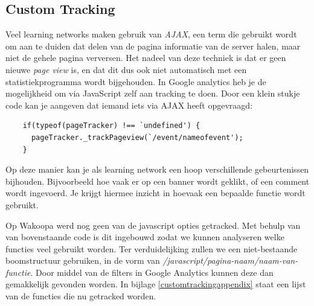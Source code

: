 \documentclass[a4paper, 10pt, pdftex]{report}
\begin{document}
    \subsection{Custom Tracking}
    Veel learning networks maken gebruik van \emph{AJAX}, een term die gebruikt wordt om aan te duiden dat delen van de pagina informatie van de server halen, maar niet de gehele pagina verversen. Het nadeel van deze techniek is dat er geen nieuwe \emph{page view} is, en dat dit dus ook niet automatisch met een statistiekprogramma wordt bijgehouden. In Google analytics heb je de mogelijkheid om via JavaScript zelf aan tracking te doen. Door een klein stukje code kan je aangeven dat iemand iets via AJAX heeft opgevraagd:
    \begin{verbatim}
    if(typeof(pageTracker) !== `undefined') {
      pageTracker._trackPageview(`/event/nameofevent');
    }
    \end{verbatim}
    Op deze manier kan je als learning network een hoop verschillende gebeurtenissen bijhouden. Bijvoorbeeld hoe vaak er op een banner wordt geklikt, of een comment wordt ingevoerd. Je krijgt hiermee inzicht in hoevaak een bepaalde functie wordt gebruikt.

    Op Wakoopa werd nog geen van de javascript opties getracked. Met behulp van van bovenstaande code is dit ingebouwd zodat we kunnen analyseren welke functies veel gebruikt worden. Ter verduidelijking zullen we een niet-bestaande boomstructuur gebruiken, in de vorm van \emph{/javascript/pagina-naam/naam-van-functie}. Door middel van de filters in Google Analytics kunnen deze dan gemakkelijk gevonden worden. In bijlage \ref{customtrackingappendix} staat een lijst van de functies die nu getracked worden.
\end{document}
